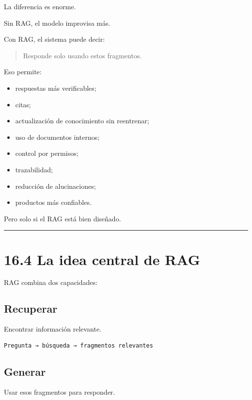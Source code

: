 La diferencia es enorme.

Sin RAG, el modelo improvisa más.

Con RAG, el sistema puede decir:

\begin{quote}
Responde solo usando estos fragmentos.
\end{quote}

Eso permite:

\begin{itemize}
\tightlist
\item
  respuestas más verificables;
\item
  citas;
\item
  actualización de conocimiento sin reentrenar;
\item
  uso de documentos internos;
\item
  control por permisos;
\item
  trazabilidad;
\item
  reducción de alucinaciones;
\item
  productos más confiables.
\end{itemize}

Pero solo si el RAG está bien diseñado.

\begin{center}\rule{0.5\linewidth}{0.5pt}\end{center}

\section{16.4 La idea central de RAG}\label{la-idea-central-de-rag}

RAG combina dos capacidades:

\subsection{Recuperar}\label{recuperar}

Encontrar información relevante.

\begin{lstlisting}
Pregunta → búsqueda → fragmentos relevantes
\end{lstlisting}

\subsection{Generar}\label{generar}

Usar esos fragmentos para responder.

